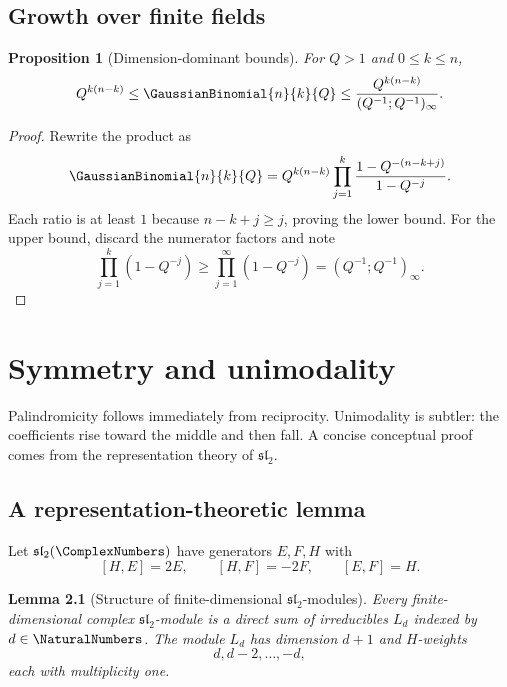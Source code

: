 \documentclass[11pt,a4paper,oneside,openany]{book}
\newtheorem{lemma}[lemma]{Lemma}
\newtheorem{proposition}[proposition]{Proposition}
\theoremstyle{definition}
\theoremstyle{remark}
\begin{document}
\section{Growth over finite fields}

\begin{proposition}[Dimension-dominant bounds]\label{prop:qbinom-growth}
For $Q>1$ and $0\le k\le n$,
\[
 Q^{k(n-k)}
 \le \GaussianBinomial{n}{k}{Q}
 \le \frac{Q^{k(n-k)}}{(Q^{-1};Q^{-1})_\infty}.
\]
\end{proposition}

\begin{proof}
Rewrite the product as
\[
 \GaussianBinomial{n}{k}{Q}
 =Q^{k(n-k)}
 \prod_{j=1}^{k}\frac{1-Q^{-(n-k+j)}}{1-Q^{-j}}.
\]
Each ratio is at least $1$ because $n-k+j\ge j$, proving the lower bound.  For the upper bound, discard the numerator factors and note
\[
 \prod_{j=1}^{k}(1-Q^{-j})\ge\prod_{j=1}^{\infty}(1-Q^{-j})=(Q^{-1};Q^{-1})_\infty.
\]
\end{proof}

\chapter{Symmetry and unimodality}\label{chap:unimodality}

Palindromicity follows immediately from reciprocity.  Unimodality is subtler: the coefficients rise toward the middle and then fall.  A concise conceptual proof comes from the representation theory of $\mathfrak{sl}_2$.

\section{A representation-theoretic lemma}

Let $\mathfrak{sl}_2(\ComplexNumbers)$ have generators $E,F,H$ with
\[
 [H,E]=2E,\qquad [H,F]=-2F,\qquad [E,F]=H.
\]

\begin{lemma}[Structure of finite-dimensional $\mathfrak{sl}_2$-modules]\label{lem:sl2-structure}
Every finite-dimensional complex $\mathfrak{sl}_2$-module is a direct sum of irreducibles $L_d$ indexed by $d\in\NaturalNumbers$.  The module $L_d$ has dimension $d+1$ and $H$-weights
\[
 d,d-2,\dots,-d,
\]
each with multiplicity one.
\end{lemma}
\end{document}
